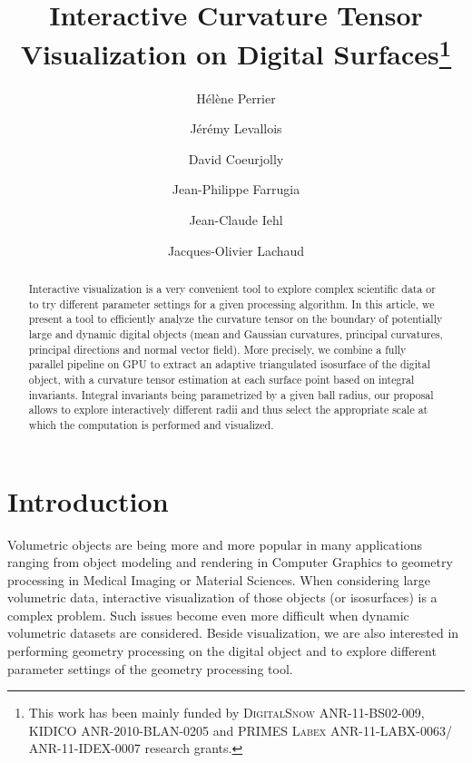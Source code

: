 \documentclass{llncs}
\title{Interactive Curvature Tensor Visualization on Digital
Surfaces\thanks{This work has been mainly funded by \textsc{DigitalSnow}
ANR-11-BS02-009, \textsc{KIDICO} ANR-2010-BLAN-0205 and \textsc{PRIMES Labex}
ANR-11-LABX-0063/ ANR-11-IDEX-0007 research grants.}}
\author{H\'el\`ene Perrier\inst{1}\and J\'er\'emy Levallois\inst{1,2}\and David
Coeurjolly\inst{1}\and Jean-Philippe Farrugia\inst{1}\and Jean-Claude
Iehl\inst{1}\and Jacques-Olivier Lachaud\inst{2} }
\institute{ Universit\'e de Lyon, CNRS\\
   LIRIS, UMR5205, F-69621, France
   \and
Universit\'e de Savoie Mont Blanc, CNRS\\
LAMA, UMR5127, F-73776, France\\
}
\begin{document}
\maketitle


\begin{abstract}\sloppy
  Interactive visualization is a very convenient tool to explore
  complex scientific data or to try different parameter settings
  for a given processing algorithm. In this article, we present a tool
  to efficiently analyze the curvature tensor on the boundary of
  potentially large and dynamic digital objects (mean and Gaussian curvatures,
  principal curvatures, principal directions and normal vector
  field). More precisely, we combine a fully parallel pipeline on GPU
  to extract an adaptive triangulated isosurface of the digital
  object, with a curvature tensor estimation at each surface point
  based on integral invariants. Integral invariants being parametrized
  by a given ball radius, our proposal allows to explore
  interactively different radii and thus select the appropriate scale
  at which the computation is performed and visualized.

\end{abstract}

\section{Introduction}
\label{sec:introduction}

Volumetric objects are being more and more popular in many
applications ranging from object modeling and rendering in Computer
Graphics to geometry processing in Medical Imaging or Material
Sciences. When considering large volumetric data, interactive
visualization of those objects (or isosurfaces) is a complex
problem. Such issues become even more difficult when dynamic
volumetric datasets are considered. Beside
visualization, we are also interested in performing geometry
processing on the digital object and to explore different parameter
settings of the geometry processing tool.
\end{document}
